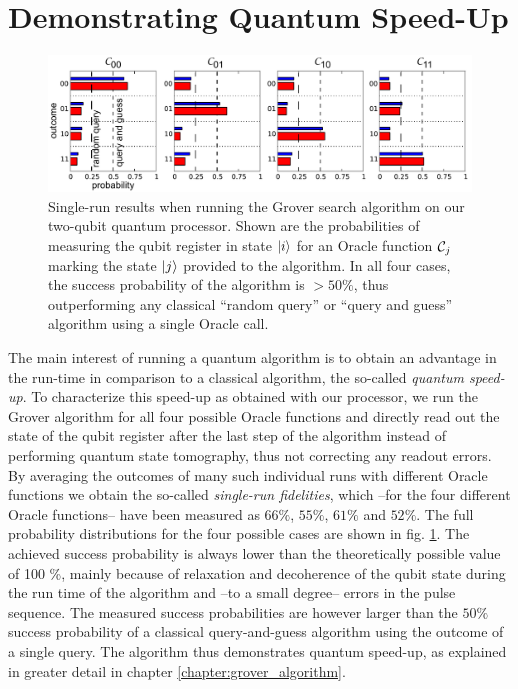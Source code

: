 \section{Demonstrating Quantum Speed-Up}

%
\begin{figure}[ht!]
 \centering \includegraphics[width=1\textwidth]{"./data/ct5/2011_04_21 - grover and tomo/good_data/grover algorithm - single run probabilities"}
\caption[Single-run results of the Grover search algorithm]{Single-run results when running the Grover search algorithm on our
two-qubit quantum processor. Shown are the probabilities of measuring the qubit register in state $\left| i \right>$ for an Oracle function $\Or_j$ marking the state $\left| j \right>$
provided to the algorithm. In all four cases, the success probability
of the algorithm is $>50\%$, thus outperforming any classical ``random query'' or ``query and guess''
algorithm using a single Oracle call.}


\label{fig:grover_single_shot_probabilities} %
\end{figure}


The main interest of running a quantum algorithm is to obtain an advantage
in the run-time in comparison to a classical algorithm, the so-called
\textit{quantum speed-up}. To characterize this speed-up as obtained
with our processor, we run the Grover algorithm for all four possible
Oracle functions and directly read out the state of the qubit register
after the last step of the algorithm instead of performing quantum
state tomography, thus not correcting any readout errors. By averaging
the outcomes of many such individual runs with different
Oracle functions we obtain the so-called \textit{single-run fidelities},
which --for the four different Oracle functions-- have been measured
as $66\%$, $55\%$, $61\%$ and $52\%$. The full probability distributions
for the four possible cases are shown in fig.
\ref{fig:grover_single_shot_probabilities}. The achieved success
probability is always lower than the theoretically possible value
of 100 \%, mainly because of relaxation and decoherence of the qubit
state during the run time of the algorithm and --to a small degree-- errors in the
pulse sequence. The measured success probabilities
are however larger than the $50\%$ success probability of a classical
query-and-guess algorithm using the outcome of a single query. The algorithm thus
demonstrates quantum speed-up, as
explained in greater detail in chapter \ref{chapter:grover_algorithm}. 

